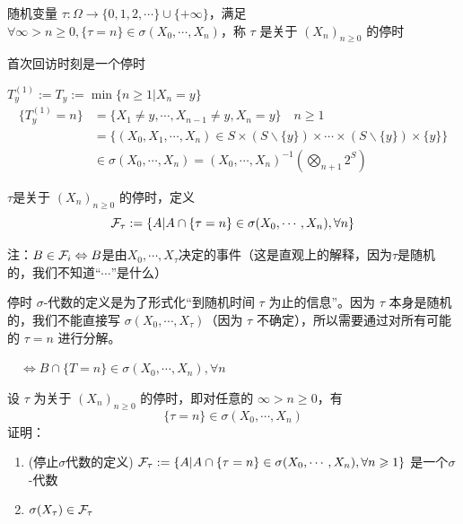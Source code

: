 \begin{definition}
    随机变量 $\tau:\Omega\to \{0,1,2,\cdots\}\cup\{+\infty\}$，满足 $\forall \infty>n\geq 0, \{\tau=n\}\in \sigma(X_0,\cdots,X_n)$，称 $\tau$ 是关于 $(X_n)_{n\geq 0}$ 的停时
\end{definition}

\begin{example}
首次回访时刻是一个停时

    $T_y^{(1)}:=T_y:=\min\{n\geq 1|X_n=y\}$
    \[
    \begin{aligned}
        \{T_y^{(1)}=n\} &=\{X_1\neq y,\cdots,X_{n-1}\neq y,X_n=y\}\quad n\geq 1\\
        &=\{(X_0,X_1,\cdots,X_n)\in S\times(S\backslash \{y\})\times\cdots\times(S\backslash \{y\})\times \{y\}\}\\
        &\in \sigma(X_0,\cdots,X_n)=(X_0,\cdots,X_n)^{-1}(\bigotimes_{n+1}2^S)
    \end{aligned}
    \]
\end{example}

\begin{definition}[停止$\sigma$代数]
    $\tau$是关于 $(X_n)_{n\geq 0}$ 的停时，定义
    \[
    \mathcal{F}_{\tau}:=\{A|A\cap\{\tau=n\}\in\sigma(X_0,\cdots,X_n),\forall n\}
    \]
\end{definition}

注：$B\in \mathcal{F}_i\Leftrightarrow B$是由$X_0,\cdots,X_{\tau}$决定的事件（这是直观上的解释，因为$\tau$是随机的，我们不知道“$\cdots$”是什么）

停时 $\sigma$-代数的定义是为了形式化“到随机时间 $\tau$ 为止的信息”。因为 $\tau$ 本身是随机的，我们不能直接写 $\sigma(X_0,\cdots,X_{\tau})$（因为 $\tau$ 不确定），所以需要通过对所有可能的 $\tau=n$ 进行分解。

$\quad \Leftrightarrow B\cap\{T=n\}\in \sigma(X_0,\cdots,X_n),\forall n$

\begin{problem}[作业5-2]
设 $\tau$ 为关于 $(X_n)_{n\geq 0}$ 的停时，即对任意的 $\infty>n\geq 0$，有
\[
\{\tau=n\}\in\sigma(X_0,\cdots,X_n)
\]
证明：
\begin{enumerate}
\item (停止$\sigma$代数的定义) $\mathcal{F}_{\tau}:=\{A|A\cap \{\tau=n\}\in \sigma(X_0,\cdots,X_n),\forall n\geqslant 1\}$ 是一个$\sigma$-代数
\item $\sigma(X_{\tau})\in \mathcal{F}_{\tau}$
\end{enumerate}
\end{problem}


